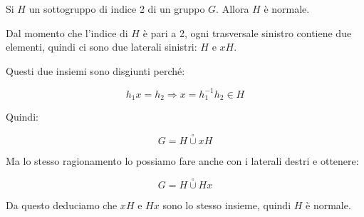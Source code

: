 \begin{teorema}
	\label{thr:sottogruppi_di_indice_2}
	Si $H$ un sottogruppo di indice 2 di un gruppo $G$. Allora $H$ è normale.
\end{teorema}
\begin{dimostrazione}
	Dal momento che l'indice di $H$ è pari a 2, ogni trasversale sinistro contiene due elementi, quindi ci sono due laterali sinistri: $H$ e $xH$.
	
	Questi due insiemi sono disgiunti perché:
	
	\begin{equation}
		h_1x = h_2 \Longrightarrow x = h_1^{-1}h_2 \in H
	\end{equation}

	Quindi:
	
	\begin{equation}
		G = H \overset{\circ}{\cup} xH
	\end{equation}

	Ma lo stesso ragionamento lo possiamo fare anche con i laterali destri e ottenere:
	
	\begin{equation}
		G = H \overset{\circ}{\cup} Hx
	\end{equation}

	Da questo deduciamo che $xH$ e $Hx$ sono lo stesso insieme, quindi $H$ è normale.
\end{dimostrazione}